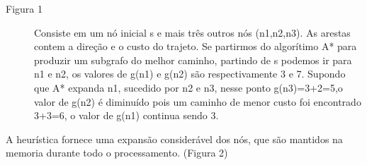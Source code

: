 \begin{description}
    \item[Figura 1] Consiste em um nó inicial s e mais três outros nós (n1,n2,n3). As arestas contem a direção e o custo do trajeto. Se partirmos do algorítimo A* para produzir um subgrafo do melhor caminho, partindo de s podemos ir para n1 e n2, os valores de g(n1) e g(n2) são respectivamente 3 e 7. Supondo que A* expanda n1, sucedido por n2 e n3, nesse ponto g(n3)=3+2=5,o valor de g(n2) é diminuído pois um caminho de menor custo foi encontrado  3+3=6, o valor de g(n1) continua sendo 3. 
    
\end{description}

A heurística fornece uma expansão considerável dos nós, que são mantidos na memoria durante todo o processamento. (Figura 2)




\begin{minipage}{\linewidth}
\end{minipage}

